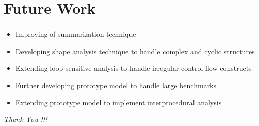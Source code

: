 \documentclass{beamer}
\begin{document}
\section{Future Work}
\frame
{
	\frametitle{\secname}
	\begin{itemize}
	\item Improving of summarization technique
	\end{itemize}
	\pause
	\begin{itemize}
	\item Developing shape analysis technique to handle complex and cyclic structures
	\end{itemize}
	\pause
	\begin{itemize}
	\item Extending loop sensitive analysis to handle irregular control flow constructs
	\end{itemize}	
	\pause
	\begin{itemize}
	\item Further developing prototype model to handle large benchmarks
	\end{itemize}
	\pause
	\begin{itemize}
	\item Extending prototype model to implement interprocedural analysis
	\end{itemize}
	
}

\begin{frame}[plain]

	\begin{center}
	\Huge{\emph{\blue Thank You !!!}}
	\end{center}

\end{frame}

%
%
\end{document}
